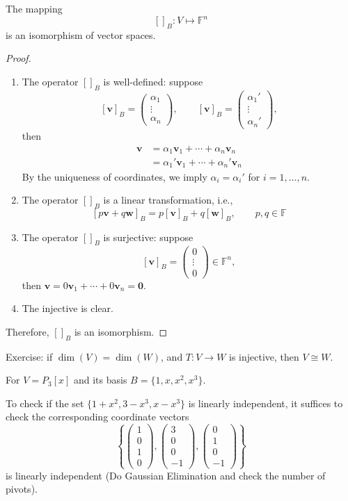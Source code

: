 \begin{theorem}
The mapping 
\[
[]_B:V\mapsto\mathbb{F}^n
\]
is an isomorphism of vector spaces.
\end{theorem}
\begin{proof}
\begin{enumerate}
\item
The operator $[]_B$ is well-defined: suppose
\[
[\bm v]_B=\begin{pmatrix}
\alpha_1\\\vdots\\\alpha_n
\end{pmatrix},\qquad
[\bm v]_B=\begin{pmatrix}
\alpha_1'\\\vdots\\\alpha_n'
\end{pmatrix},
\]
then 
\begin{align*}
\bm v&=\alpha_1\bm v_1+\cdots+\alpha_n\bm v_n\\
&=\alpha_1'\bm v_1+\cdots+\alpha_n'\bm v_n
\end{align*}
By the uniqueness of coordinates, we imply $\alpha_i=\alpha_i'$ for $i=1,\dots,n$.
\item
The operator $[]_B$ is a linear transformation, i.e., 
\[
[p\bm v+q\bm w]_B=p[\bm v]_B+q[\bm w]_B,\qquad
p,q\in\mathbb{F}
\]
\item
The operator $[]_B$ is surjective: suppose
\[
[\bm v]_B=\begin{pmatrix}
0\\\vdots\\0
\end{pmatrix}\in\mathbb{F}^n,
\]
then $\bm v=0\bm v_1+\cdots+0\bm v_n=\bm0$.
\item
The injective is clear.


\end{enumerate}
Therefore, $[]_B$ is an isomorphism.
\end{proof}

Exercise: if $\dim(V)=\dim(W)$, and $T:V\to W$ is injective, then $V\cong W$.

\begin{example}
For $V=P_3[x]$ and its basis $B=\{1,x,x^2,x^3\}$.

To check if the set $\{1+x^2,3-x^3,x-x^3\}$ is linearly independent, it suffices to check the corresponding coordinate vectors
\[
\left\{
\begin{pmatrix}
1\\0\\1\\0
\end{pmatrix},
\begin{pmatrix}
3\\0\\0\\-1
\end{pmatrix},
\begin{pmatrix}
0\\1\\0\\-1
\end{pmatrix}
\right\}
\]
is linearly independent (Do Gaussian Elimination and check the number of pivots).
\end{example}

